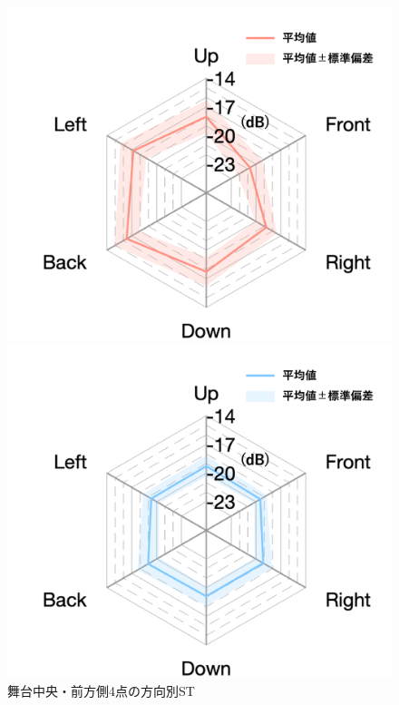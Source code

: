 \documentclass[11pt,a4j]{jreport}
\begin{document}
    \begin{figure}[H]
      \begin{minipage}
        [b]{.5\linewidth}
        \centering
        \includegraphics[width=1\linewidth]{images/targetFieldEarlywithLegend.png}
      \end{minipage}%
      \begin{minipage}
        [b]{.5\linewidth}
        \centering
        \includegraphics[width=1\linewidth]{images/targetFieldLatewithLegend.png}
      \end{minipage}
    \centering
    \label{fig:舞台中央・前方側4点の方向別ST}
    \caption{舞台中央・前方側4点の方向別ST}
    \end{figure}
\end{document}
